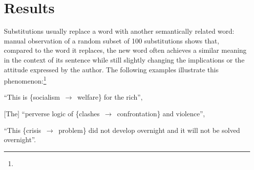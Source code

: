 \section{Results}\label{sec:results}

\begin{new}

Substitutions usually replace a word with another semantically related word:
manual observation of a random subset of 100 substitutions shows that, compared to the word it replaces, the new word often achieves a similar meaning in the context of its sentence while still slightly changing the implications or the attitude expressed by the author.
The following examples illustrate this phenomenon:\footnote{
}
\begin{APAitemize}
	\item ``This is \{socialism~$\rightarrow$~welfare\} for the rich'',
	\item {[}The{]} ``perverse logic of \{clashes~$\rightarrow$~confrontation\} and violence'',
	\item ``This \{crisis~$\rightarrow$~problem\} did not develop overnight and it will not be solved overnight''.
\end{APAitemize}



\end{new}

